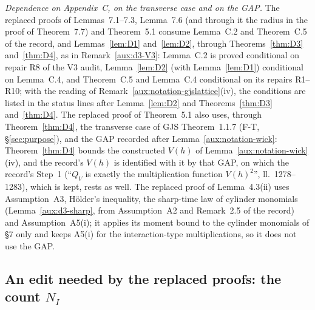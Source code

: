 \emph{Dependence on Appendix~C, on the transverse case and on the GAP.}  The replaced proofs of
Lemmas~7.1--7.3, Lemma~7.6 (and through it the radius in the proof of Theorem~7.7) and
Theorem~5.1 consume Lemma~C.2 and Theorem~C.5 of the record, and Lemmas~\ref{lem:D1}
and~\ref{lem:D2}, through Theorems~\ref{thm:D3} and~\ref{thm:D4}, as in Remark~\ref{aux:d3-V3}:
Lemma~C.2 is proved conditional on repair R8 of the V3 audit, Lemma~\ref{lem:D2} (with
Lemma~\ref{lem:D1}) conditional on Lemma~C.4, and Theorem~C.5 and Lemma~C.4 conditional on its
repairs R1--R10; with the reading of Remark~\ref{aux:notation-gjslattice}(iv), the conditions are
listed in the status lines after Lemma~\ref{lem:D2} and Theorems~\ref{thm:D3} and~\ref{thm:D4}.  The replaced proof of Theorem~5.1 also uses, through
Theorem~\ref{thm:D4}, the transverse case of GJS Theorem~1.1.7 (F-T, \S\ref{sec:purpose}), and the
GAP recorded after Lemma~\ref{aux:notation-wick}: Theorem~\ref{thm:D4} bounds the constructed
$V(h)$ of Lemma~\ref{aux:notation-wick}(iv), and the record's $V(h)$ is identified with it by that
GAP, on which the record's Step~1 (``$Q_V$ is exactly the multiplication function $V(h)^2$'',
ll.~1278--1283), which is kept, rests as well.  The replaced proof of Lemma~4.3(ii) uses
Assumption~A3, H\"older's inequality, the sharp-time law of cylinder monomials
(Lemma~\ref{aux:d3-sharp}, from Assumption~A2 and Remark~2.5 of the record) and Assumption~A5(i);
it applies its moment bound to the cylinder monomials of \S7 only and keeps A5(i) for the
interaction-type multiplications, so it does not use the GAP.

\subsection{An edit needed by the replaced proofs: the count $N_I$}\label{sub:cons-NI}

